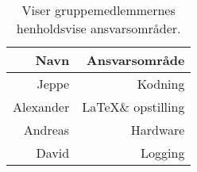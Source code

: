 \begin{table}[H]
    \centering
    \begin{tabular}{r|r}
        \hline
        Navn       & Ansvarsområde              \\ \hline \hline
        Jeppe      & Kodning                    \\ \hline
        Alexander  & \LaTeX \space\& opstilling \\ \hline
        Andreas    & Hardware                   \\ \hline
        David      & Logging                    \\ \hline
    \end{tabular}
    \caption{Viser gruppemedlemmernes henholdsvise ansvarsområder.}
    \label{sec_2:tab:ansvarsområde}
\end{table}